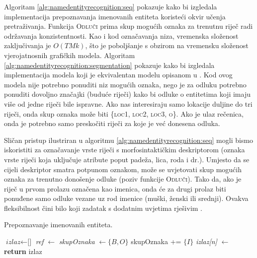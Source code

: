 Algoritam \ref{alg:namedentityrecognition:seq} pokazuje kako bi izgledala
implementacija prepoznavanja imenovanih entiteta koristeći okvir učenja
pretraživanja. Funkcija \textsc{Odluči} prima skup mogućih oznaka za trenutnu
riječ radi održavanja konzistentnosti. Kao i kod označavanja niza, vremenska
složenost zaključivanja je $O(T M k)$, što je poboljšanje s obzirom na vremensku
složenost vjerojatnosnih grafičkih modela. Algoritam
\ref{alg:namedentityrecognition:segmentation} pokazuje kako bi izgledala
implementacija modela koji je ekvivalentan modelu opisanom u
\citep{sarawagi2004semi}. Kod ovog modela nije potrebno ponuditi niz mogućih
oznaka, nego je za odluku potrebno ponuditi dovoljno značajki (buduće riječi)
kako bi odluke o entitetima koji imaju više od jedne riječi bile ispravne. Ako
nas interesiraju samo lokacije duljine do tri riječi, onda skup oznaka može biti
\{\textsc{loc1}, \textsc{loc2}, \textsc{loc3}, \textsc{o}\}. Ako je ulaz
rečenica, onda je potrebno samo preskočiti riječi za koje je već donesena
odluka.

Sličan pristup ilustriran u algoritmu \ref{alg:namedentityrecognition:seq} mogli
bismo iskoristiti za označavanje vrste riječi s morfosintaktičkim deskriptorom
(oznaka vrste riječi koja uključuje atribute poput padeža, lica, roda i dr.).
Umjesto da se cijeli deskriptor smatra potpunom oznakom, može se uvjetovati skup
mogućih oznaka za trenutno donošenje odluke (poziv funkcije \textsc{Odluči}).
Tako da, ako je riječ u prvom prolazu označena kao imenica, onda će za
drugi prolaz biti ponuđene samo odluke vezane uz rod imenice (muški, ženski
ili srednji). Ovakva fleksibilnost čini bilo koji zadatak s dodatnim uvjetima
 rješivim \citep{chang2012structured}.

\begin{algorithm}[H]
\caption{Prepoznavanje imenovanih entiteta.}
\label{alg:namedentityrecognition:seq}
\begin{algorithmic}[1]
\State $\textit{izlaz} \gets \text{[]}$
  \State \textit{ref} $\gets$ 
  \State \textit{skupOznaka} $\gets \{B,O\}$
    \State skupOznaka += $\{I\}$
  \EndIf
  \State \textit{izlaz[n]} $\gets$ 
\EndFor
\State {}
\State \textbf{return} izlaz
\EndFunction
\end{algorithmic}
\end{algorithm}

